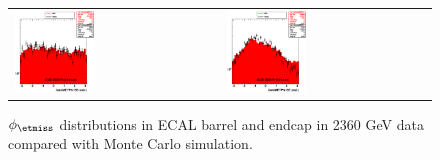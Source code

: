 \begin{figure}[h!]
 \centering
 \begin{tabular}{ll}
  \includegraphics[width=0.40\textwidth]{plots_DataVsMC_MB_2360GeV/my_calometEBPhi.eps} &
  \includegraphics[width=0.40\textwidth]{plots_DataVsMC_MB_2360GeV/my_calometEEPhi.eps} \\
 \end{tabular}
 \caption{$\phi_{\etmiss}$ distributions in ECAL barrel and endcap in 2360 GeV data compared
   with Monte Carlo simulation.
          \label{fig:DataVsMC_MB_2360_8}}
\end{figure}

